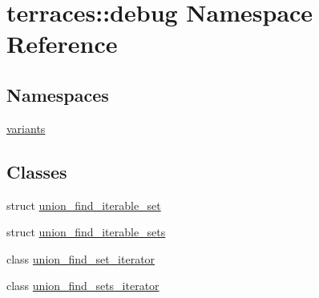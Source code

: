 \hypertarget{namespaceterraces_1_1debug}{}\section{terraces\+:\+:debug Namespace Reference}
\label{namespaceterraces_1_1debug}
\subsection*{Namespaces}
\begin{DoxyCompactItemize}
\item 
 \hyperlink{namespaceterraces_1_1debug_1_1variants}{variants}
\end{DoxyCompactItemize}
\subsection*{Classes}
\begin{DoxyCompactItemize}
\item 
struct \hyperlink{structterraces_1_1debug_1_1union__find__iterable__set}{union\+\_\+find\+\_\+iterable\+\_\+set}
\item 
struct \hyperlink{structterraces_1_1debug_1_1union__find__iterable__sets}{union\+\_\+find\+\_\+iterable\+\_\+sets}
\item 
class \hyperlink{classterraces_1_1debug_1_1union__find__set__iterator}{union\+\_\+find\+\_\+set\+\_\+iterator}
\item 
class \hyperlink{classterraces_1_1debug_1_1union__find__sets__iterator}{union\+\_\+find\+\_\+sets\+\_\+iterator}
\end{DoxyCompactItemize}

